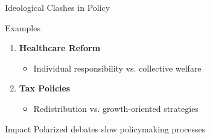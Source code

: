 \documentclass{beamer}
\begin{document}
\begin{frame}{Ideological Clashes in Policy}
    \begin{block}{Examples}
        \begin{enumerate}
            \item \textbf{Healthcare Reform}
            \begin{itemize}
                \item Individual responsibility vs. collective welfare
            \end{itemize}
            
            \item \textbf{Tax Policies}
            \begin{itemize}
                \item Redistribution vs. growth-oriented strategies
            \end{itemize}
        \end{enumerate}
    \end{block}
    
    \begin{alertblock}{Impact}
        Polarized debates slow policymaking processes
    \end{alertblock}
\end{frame}
\end{document}
